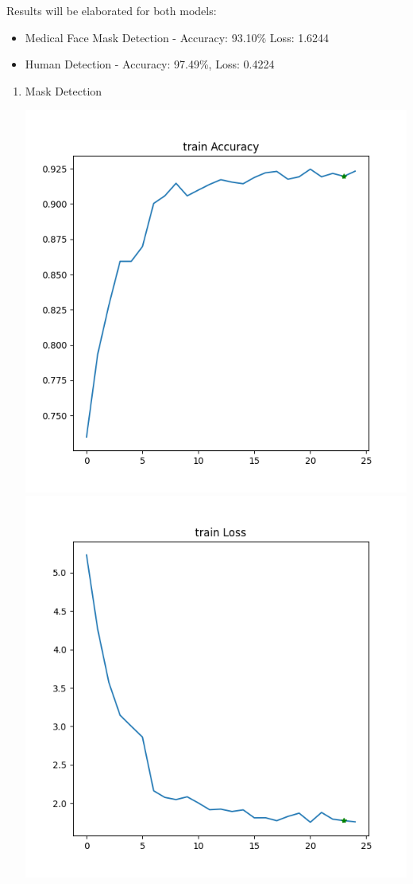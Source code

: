 Results will be elaborated for both models:


\begin{itemize}
    \item Medical Face Mask Detection - Accuracy: 93.10\% Loss: 1.6244
    \item Human Detection - Accuracy: 97.49\%, Loss: 0.4224
\end{itemize}

\begin{enumerate}
    \item Mask Detection


    \includegraphics[scale=0.5]{images/report/FaceMask-train-accuracy}
    \includegraphics[scale=0.5]{images/report/FaceMask-train-loss}


\end{enumerate}
